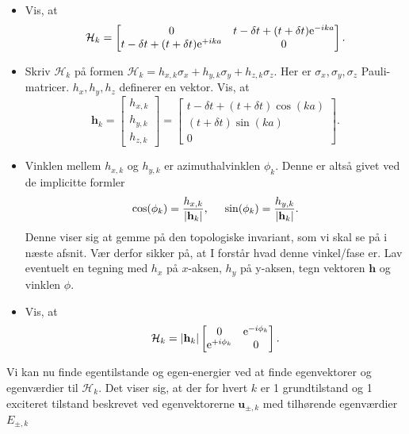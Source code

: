 \documentclass[11pt, a4paper]{article}
\def\te{{\rm e}}
\begin{document}
\begin{itemize}
	\item Vis, at
	\begin{equation}
	\mathcal{H}_k = \begin{bmatrix} 0 & t - \delta t + (t + \delta t)\te^{-ika} \\ t - \delta t + (t + \delta t)\te^{+ika} & 0 \end{bmatrix}.
	\end{equation}  

	\item Skriv $\mathcal{H}_k$ på formen $\mathcal{H}_k = h_{x, k} \sigma_x + h_{y, k} \sigma_y + h_{z, k} \sigma_z$. Her er $\sigma_x, \sigma_y, \sigma_z$ Pauli-matricer. $h_x, h_y, h_z$ definerer en vektor. Vis, at
	\begin{equation}
	\mathbf{h}_k = \begin{bmatrix} h_{x, k} \\ h_{y, k} \\ h_{z, k} \end{bmatrix} = \begin{bmatrix}  t - \delta t + (t + \delta t)\cos(ka) \\ (t + \delta t)\sin(ka) \\ 0 \end{bmatrix}.
	\end{equation}

	\item Vinklen mellem $h_{x, k}$ og $h_{y, k}$ er azimuthalvinklen $\phi_k$. Denne er altså givet ved de implicitte formler
	\begin{equation}
	\cos(\phi_k) = \frac{h_{x, k}}{|\mathbf{h}_k|}, \hspace{0.5cm} \sin(\phi_k) = \frac{h_{y, k}}{|\mathbf{h}_k|}.
	\label{eq.phik_definition}
	\end{equation}
	Denne viser sig at gemme på den topologiske invariant, som vi skal se på i næste afsnit. Vær derfor sikker på, at I forstår hvad denne vinkel/fase er. Lav eventuelt en tegning med $h_x$ på $x$-aksen, $h_y$ på y-aksen, tegn vektoren $\mathbf{h}$ og vinklen $\phi$. 

	\item Vis, at
	\begin{equation}
	\mathcal{H}_k = |\mathbf{h}_k| \begin{bmatrix} 0 & \te^{-i \phi_k} \\ \te^{+i \phi_k} & 0 \end{bmatrix}.
	\label{eq.H_k_final}
	\end{equation}
\end{itemize}
Vi kan nu finde egentilstande og egen-energier ved at finde egenvektorer og egenværdier til $\mathcal{H}_k$. Det viser sig, at der for hvert $k$ er 1 grundtilstand og 1 exciteret tilstand beskrevet ved egenvektorerne $\mathbf{u}_{\pm, k}$ med tilhørende egenværdier $E_{\pm, k}$
\end{document}
